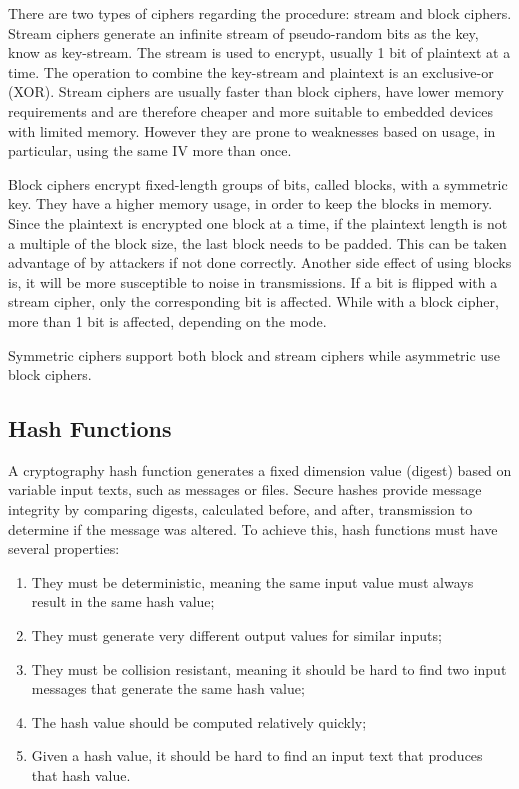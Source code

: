 There are two types of ciphers regarding the procedure: stream and block ciphers.
Stream ciphers generate an infinite stream of pseudo-random bits as the key, know as key-stream. The stream is used to encrypt, usually 1 bit of plaintext at a time. The operation to combine the key-stream and plaintext is an exclusive-or (XOR). Stream ciphers are usually faster than block ciphers, have lower memory requirements and are therefore cheaper and more suitable to embedded devices with limited memory. However they are prone to weaknesses based on usage, in particular, using the same \ac{IV} more than once. 

Block ciphers encrypt fixed-length groups of bits, called blocks, with a symmetric key. They have a higher memory usage, in order to keep the blocks in memory. Since the plaintext is encrypted one block at a time, if the plaintext length is not a multiple of the block size, the last block needs to be padded. This can be taken advantage of by attackers if not done correctly. Another side effect of using blocks is, it will be more susceptible to noise in transmissions. If a bit is flipped with a stream cipher, only the corresponding bit is affected. While with a block cipher, more than 1 bit is affected, depending on the mode.

Symmetric ciphers support both block and stream ciphers while asymmetric use block ciphers.

\subsection{Hash Functions}\label{chap:background:crypto:hash}

A cryptography hash function generates a fixed dimension value (digest) based on variable input texts, such as messages or files. Secure hashes provide message integrity by comparing digests, calculated before, and after, transmission to determine if the message was altered. To achieve this, hash functions must have several properties:
\begin{enumerate}
    \item They must be deterministic, meaning the same input value must always result in the same hash value;
    \item They must generate very different output values for similar inputs;
    \item They must be collision resistant, meaning it should be hard to find two input messages that generate the same hash value;
    \item The hash value should be computed relatively quickly;
    \item Given a hash value, it should be hard to find an input text that produces that hash value.
\end{enumerate}

